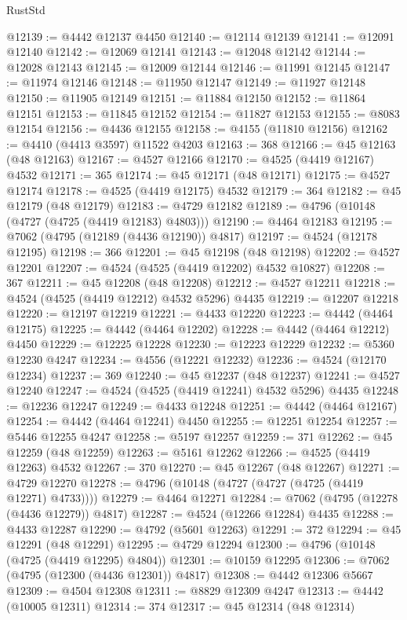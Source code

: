 \begin{lexlean}{RustStd}
\begin{coremodule}
@12139 := @4442 @12137 @4450
@12140 := @12114 @12139
@12141 := @12091 @12140
@12142 := @12069 @12141
@12143 := @12048 @12142
@12144 := @12028 @12143
@12145 := @12009 @12144
@12146 := @11991 @12145
@12147 := @11974 @12146
@12148 := @11950 @12147
@12149 := @11927 @12148
@12150 := @11905 @12149
@12151 := @11884 @12150
@12152 := @11864 @12151
@12153 := @11845 @12152
@12154 := @11827 @12153
@12155 := @8083 @12154
@12156 := @4436 @12155
@12158 := @4155 (@11810 @12156)
@12162 := @4410 (@4413 @3597) @11522 @4203
@12163 := 368
@12166 := @45 @12163 (@48 @12163)
@12167 := @4527 @12166
@12170 := @4525 (@4419 @12167) @4532
@12171 := 365
@12174 := @45 @12171 (@48 @12171)
@12175 := @4527 @12174
@12178 := @4525 (@4419 @12175) @4532
@12179 := 364
@12182 := @45 @12179 (@48 @12179)
@12183 := @4729 @12182
@12189 := @4796 (@10148 (@4727 (@4725 (@4419 @12183) @4803)))
@12190 := @4464 @12183
@12195 := @7062 (@4795 (@12189 (@4436 @12190)) @4817)
@12197 := @4524 (@12178 @12195)
@12198 := 366
@12201 := @45 @12198 (@48 @12198)
@12202 := @4527 @12201
@12207 := @4524 (@4525 (@4419 @12202) @4532 @10827)
@12208 := 367
@12211 := @45 @12208 (@48 @12208)
@12212 := @4527 @12211
@12218 := @4524 (@4525 (@4419 @12212) @4532 @5296) @4435
@12219 := @12207 @12218
@12220 := @12197 @12219
@12221 := @4433 @12220
@12223 := @4442 (@4464 @12175)
@12225 := @4442 (@4464 @12202)
@12228 := @4442 (@4464 @12212) @4450
@12229 := @12225 @12228
@12230 := @12223 @12229
@12232 := @5360 @12230 @4247
@12234 := @4556 (@12221 @12232)
@12236 := @4524 (@12170 @12234)
@12237 := 369
@12240 := @45 @12237 (@48 @12237)
@12241 := @4527 @12240
@12247 := @4524 (@4525 (@4419 @12241) @4532 @5296) @4435
@12248 := @12236 @12247
@12249 := @4433 @12248
@12251 := @4442 (@4464 @12167)
@12254 := @4442 (@4464 @12241) @4450
@12255 := @12251 @12254
@12257 := @5446 @12255 @4247
@12258 := @5197 @12257
@12259 := 371
@12262 := @45 @12259 (@48 @12259)
@12263 := @5161 @12262
@12266 := @4525 (@4419 @12263) @4532
@12267 := 370
@12270 := @45 @12267 (@48 @12267)
@12271 := @4729 @12270
@12278 := @4796 (@10148 (@4727 (@4727 (@4725 (@4419 @12271) @4733))))
@12279 := @4464 @12271
@12284 := @7062 (@4795 (@12278 (@4436 @12279)) @4817)
@12287 := @4524 (@12266 @12284) @4435
@12288 := @4433 @12287
@12290 := @4792 (@5601 @12263)
@12291 := 372
@12294 := @45 @12291 (@48 @12291)
@12295 := @4729 @12294
@12300 := @4796 (@10148 (@4725 (@4419 @12295) @4804))
@12301 := @10159 @12295
@12306 := @7062 (@4795 (@12300 (@4436 @12301)) @4817)
@12308 := @4442 @12306 @5667
@12309 := @4504 @12308
@12311 := @8829 @12309 @4247
@12313 := @4442 (@10005 @12311)
@12314 := 374
@12317 := @45 @12314 (@48 @12314)

\end{coremodule}
\end{lexlean}
